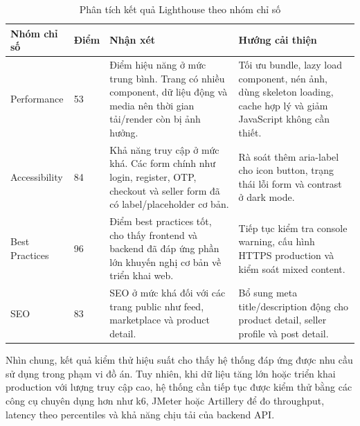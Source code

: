 \begin{table}[H]
\centering
\caption{Phân tích kết quả Lighthouse theo nhóm chỉ số}
\begin{tabularx}{\textwidth}{|p{}|p{}|X|p{}|}
\hline
\textbf{Nhóm chỉ số} & \textbf{Điểm} & \textbf{Nhận xét} & \textbf{Hướng cải thiện} \\ \hline
Performance & 53 & Điểm hiệu năng ở mức trung bình. Trang có nhiều component, dữ liệu động và media nên thời gian tải/render còn bị ảnh hưởng. & Tối ưu bundle, lazy load component, nén ảnh, dùng skeleton loading, cache hợp lý và giảm JavaScript không cần thiết. \\ \hline
Accessibility & 84 & Khả năng truy cập ở mức khá. Các form chính như login, register, OTP, checkout và seller form đã có label/placeholder cơ bản. & Rà soát thêm aria-label cho icon button, trạng thái lỗi form và contrast ở dark mode. \\ \hline
Best Practices & 96 & Điểm best practices tốt, cho thấy frontend và backend đã đáp ứng phần lớn khuyến nghị cơ bản về triển khai web. & Tiếp tục kiểm tra console warning, cấu hình HTTPS production và kiểm soát mixed content. \\ \hline
SEO & 83 & SEO ở mức khá đối với các trang public như feed, marketplace và product detail. & Bổ sung meta title/description động cho product detail, seller profile và post detail. \\ \hline
\end{tabularx}
\end{table}

Nhìn chung, kết quả kiểm thử hiệu suất cho thấy hệ thống đáp ứng được nhu cầu sử dụng trong phạm vi đồ án. Tuy nhiên, khi dữ liệu tăng lớn hoặc triển khai production với lượng truy cập cao, hệ thống cần tiếp tục được kiểm thử bằng các công cụ chuyên dụng hơn như k6, JMeter hoặc Artillery để đo throughput, latency theo percentiles và khả năng chịu tải của backend API.


